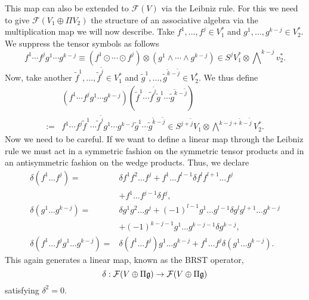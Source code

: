 This map can also be extended to $\mathcal{F}(V)$ via the Leibniz rule. For this we need to give $\mathcal{F}(V_1\oplus\Pi V_2)$ the structure of an associative algebra via the multiplication map we will now describe. Take $f^1,\dots,f^j\in V_1^*$ and $g^1,\dots,g^{k-j}\in V_2^*$. We suppress the tensor symbols as follows
\begin{equation}
f^1\cdots f^j g^1\cdots g^{k-j}\equiv(f^1\odot\cdots\odot f^j)\otimes(g^1\wedge\cdots\wedge g^{k-j})\in S^j V_1^*\otimes\bigwedge\nolimits^{k-j}v_2^*.
\end{equation} 
Now, take another $\tilde{f}^1,\dots,\tilde{f}^{\tilde{j}}\in V_1^*$ and $\tilde{g}^1,\dots,\tilde{g}^{\tilde{k}-\tilde{j}}\in V_2^*$. We thus define
\begin{equation}
\begin{aligned}
&(f^1\cdots f^j g^1\cdots g^{k-j})(\tilde{f}^1\cdots\tilde{f}^{\tilde{j}}\tilde{g}^1\cdots\tilde{g}^{\tilde{k}-\tilde{j}})\\
:=&f^1\cdots f^j\tilde{f}^1\cdots\tilde{f}^{\tilde{j}}g^1\cdots g^{k-j}\tilde{g}^1\cdots\tilde{g}^{\tilde{k}-\tilde{j}}\in S^{j+\tilde{j}}V_1\otimes\bigwedge\nolimits^{k-j+\tilde{k}-\tilde{j}}V_2^*.
\end{aligned}
\end{equation} 
Now we need to be careful. If we want to define a linear map through the Leibniz rule we must act in a symmetric fashion on the symmetric tensor products and in an antisymmetric fashion on the wedge products. Thus, we declare
\begin{equation}\label{eq:leibniz_rep}
\begin{aligned}
\delta(f^1\dots f^j)=&\delta f^1 f^2\dots f^j+ f^1\dots f^{l-1}\delta f^l f^{l+1}\dots f^j\\
&+f^1\dots f^{j-1}\delta f^j,\\
\delta(g^1\dots g^{k-j})=&\delta g^1 g^2\dots g^j+(-1)^{l-1}g^1\dots g^{l-1}\delta g^l g^{l+1}\dots g^{k-j}\\
&+(-1)^{k-j-1}g^1\dots g^{k-j-1}\delta g^{k-j},\\
\delta(f^1\dots f^j g^1\dots g^{k-j})=&\delta(f^1\dots f^j)g^1\dots g^{k-j}+f^1\dots f^j\delta(g^1\dots g^{k-j}).
\end{aligned}
\end{equation}
This again generates a linear map, known as the BRST operator,
\begin{equation}
\delta:\mathcal{F}(V\oplus\Pi\mathfrak{g})\rightarrow\mathcal{F}(V\oplus\Pi\mathfrak{g})
\end{equation}
satisfying $\delta^2=0$. 

